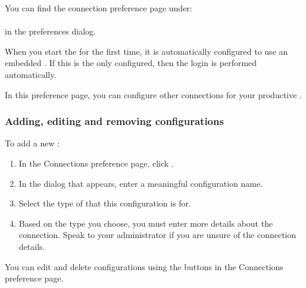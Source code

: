 


You can find the \gddb{} connection preference page under:\\
\\
in the preferences dialog.

When you start the \ite{} for the first time, it is automatically configured to use an embedded \gddb{}. If this is the only \gddb{} configured, then the \gddb{} login is performed automatically. 

In this preference page, you can configure other \gddb{} connections for your productive \gddb{}. 



\subsubsection{Adding, editing and removing \gddb{} configurations}

To add a new \gddb{}:

\begin{enumerate}
\item In the \gddb{} Connections preference page, click .
\item In the dialog that appears, enter a meaningful configuration name.
\item Select the type of \gddb{} that this configuration is for. 
\item Based on the \gddb{} type you choose, you must enter more details about the \gddb{} connection. Speak to your \gddb{} administrator if you are unsure of the connection details. 
\end{enumerate}

You can edit and delete \gddb{} configurations using the buttons in the \gddb{} Connections preference page. 
